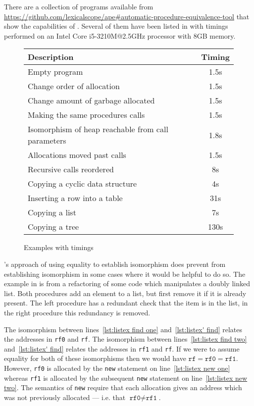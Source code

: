 \documentclass[runningheads,a4paper]{llncs}
\makeatletter
\newcommand*{\ie}{i.e.\@\xspace}
\makeatother
\begin{document}
There are a collection of programs available from \url{https://github.com/lexicalscope/ape#automatic-procedure-equivalence-tool} that show the capabilities of \tool{}. Several of them have been listed in  with timings performed on an Intel Core i5-3210M@2.5GHz processor with 8GB memory.

\begin{figure}[htbp]
\centering%
\begin{tabular}{| l | c |  }

\hline	
  {\bf Description} & {\bf Timing}\\
\hline
  Empty program & 1.5s \\		
  Change order of allocation & 1.5s  \\
  Change amount of garbage allocated & 1.5s  \\
  Making the same procedures calls & 1.5s \\
  Isomorphism of heap reachable from call parameters & 1.8s \\
  Allocations moved past calls & 1.5s \\
  Recursive calls reordered & 8s \\
  Copying a cyclic data structure & 4s \\
  Inserting a row into a table  & 31s \\
  Copying a list & 7s \\
  Copying a tree & 130s  \\
  \hline  

\end{tabular}
\caption{Examples with timings}\label{fig:progs}
\end{figure}
\metho{}'s approach of using equality to establish isomorphism does prevent \tool{} from establishing isomorphism in some cases where it would be helpful to do so. The example in  is from a refactoring of some code which manipulates a doubly linked list. Both procedures add an element to a list, but first remove it if it is already present. The left procedure has a redundant check that the item is in the list, in the right procedure this redundancy is removed.

The isomorphism between lines~\ref{lst:listex find one} and~\ref{lst:listex' find} relates the addresses in \texttt{rf0} and \texttt{rf}. The isomorphism between lines~\ref{lst:listex find two} and~\ref{lst:listex' find} relates the addresses in \texttt{rf1} and \texttt{rf}. If we were to assume equality for both of these isomorphisms then we would have $\texttt{rf} = \texttt{rf0} = \texttt{rf1}$. However, \texttt{rf0} is allocated by the \texttt{new} statement on line~\ref{lst:listex new one} whereas \texttt{rf1} is allocated by the subsequent \texttt{new} statement on line~\ref{lst:listex new two}. The semantics of \texttt{new} require that each allocation gives an address which was not previously allocated --- \ie that $\texttt{rf0} \neq \texttt{rf1}$.
\end{document}
